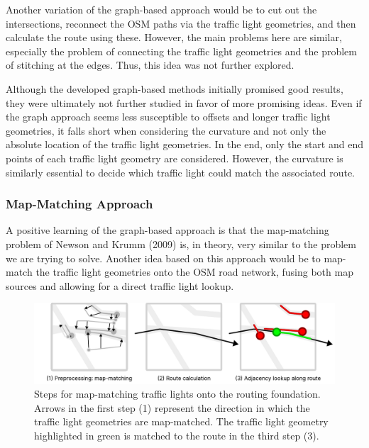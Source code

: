 Another variation of the graph-based approach would be to cut out the intersections, reconnect the OSM paths via the traffic light geometries, and then calculate the route using these. However, the main problems here are similar, especially the problem of connecting the traffic light geometries and the problem of stitching at the edges. Thus, this idea was not further explored.

Although the developed graph-based methods initially promised good results, they were ultimately not further studied in favor of more promising ideas. Even if the graph approach seems less susceptible to offsets and longer traffic light geometries, it falls short when considering the curvature and not only the absolute location of the traffic light geometries. In the end, only the start and end points of each traffic light geometry are considered. However, the curvature is similarly essential to decide which traffic light could match the associated route.

\subsubsection{Map-Matching Approach}

A positive learning of the graph-based approach is that the map-matching problem of Newson and Krumm (2009) \cite{newson_hidden_2009} is, in theory, very similar to the problem we are trying to solve. Another idea based on this approach would be to map-match the traffic light geometries onto the OSM road network, fusing both map sources and allowing for a direct traffic light lookup.

\begin{figure}[t]
\centering
\includegraphics[width=\linewidth]{images/sg-selection-map-matching-approach.pdf}
\caption{Steps for map-matching traffic lights onto the routing foundation. Arrows in the first step (1) represent the direction in which the traffic light geometries are map-matched. The traffic light geometry highlighted in green is matched to the route in the third step (3).}
\label{fig:sg-selection-map-matching-approach}
\end{figure}

